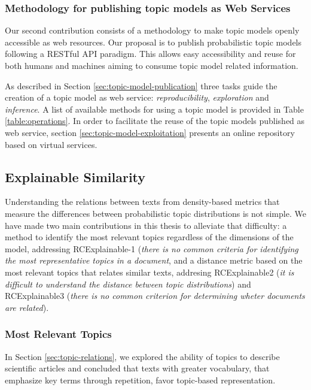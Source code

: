 \subsubsection{Methodology for publishing topic models as Web Services}

Our second contribution consists of a methodology to make topic models openly accessible as web resources. Our proposal is to publish probabilistic topic models following a RESTful API paradigm. This allows easy accessibility and reuse for both humans and machines aiming to consume topic model related information.

As described in Section \ref{sec:topic-model-publication} three tasks guide the creation of a topic model as web service: \textit{reproducibility}, \textit{exploration} and \textit{inference}. A list of available methods for using a topic model is provided in Table \ref{table:operations}. In order to facilitate the reuse of the topic models published as web service, section \ref{sec:topic-model-exploitation} presents an online repository based on virtual services.

\subsection{Explainable Similarity}

Understanding the relations between texts from density-based metrics that measure the differences between probabilistic topic distributions is not simple. We have made two main contributions in this thesis to alleviate that difficulty: a method to identify the most relevant topics regardless of the dimensions of the model, addressing RCExplainable-1 (\textit{there is no common criteria for identifying the most representative topics in a document}, and a distance metric based on the most relevant topics that relates similar texts, addresing RCExplainable2 (\textit{it is difficult to understand the distance between topic distributions}) and RCExplainable3 (\textit{there is no common criterion for determining wheter documents are related}).

\subsubsection{Most Relevant Topics}

In Section \ref{sec:topic-relations}, we explored the ability of topics to describe scientific articles and concluded that texts with greater vocabulary, that emphasize key terms through repetition, favor topic-based representation. 

